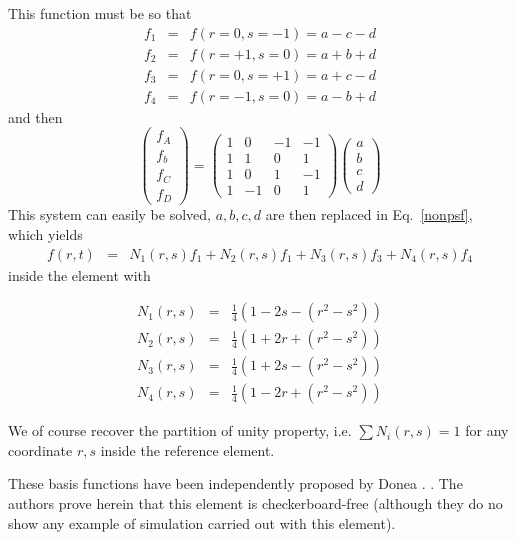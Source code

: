 This function must be so that 
\begin{eqnarray}
f_1 &=& f(r=0 ,s=-1) = a -c -d \\
f_2 &=& f(r=+1,s=0)  = a +b +d \\
f_3 &=& f(r=0 ,s=+1) = a +c -d \\
f_4 &=& f(r=-1,s=0)  = a -b +d 
\end{eqnarray}
and then 
\[
\left(
\begin{array}{c}
f_A \\ f_b \\ f_C \\ f_D
\end{array}
\right)
=
\left(
\begin{array}{cccc}
1 &0 &-1 &-1 \\
1 &1 &0 &1 \\
1 &0 &1 &-1 \\
1 &-1 &0 &1
\end{array}
\right)
\left(
\begin{array}{c}
a \\ b \\ c \\ d
\end{array}
\right)
\]
This system can easily be solved, $a,b,c,d$ are then replaced in Eq.~\eqref{nonpsf},
which yields 
\begin{eqnarray}
f(r,t) &=& N_1(r,s)f_1 +N_2(r,s)f_1 + N_3(r,s)f_3 +N_4(r,s)f_4
\end{eqnarray}
inside the element with
\begin{mdframed}[backgroundcolor=blue!5]
\begin{eqnarray}
N_1(r,s) &=& \frac{1}{4} (1-2s-(r^2-s^2)) \nonumber\\
N_2(r,s) &=& \frac{1}{4} (1+2r+(r^2-s^2)) \nonumber\\
N_3(r,s) &=& \frac{1}{4} (1+2s-(r^2-s^2)) \nonumber\\
N_4(r,s) &=& \frac{1}{4} (1-2r+(r^2-s^2)) \nonumber
\end{eqnarray}
\end{mdframed}
We of course recover the partition of unity property, i.e. $\sum N_i(r,s)=1$ for any coordinate $r,s$ inside 
the reference element.

\begin{remark}
These basis functions have been independently proposed by Donea \etal. \cite{dogm81}. The authors
prove herein that this element is checkerboard-free (although they do no show any example
of simulation carried out with this element).
\end{remark}

